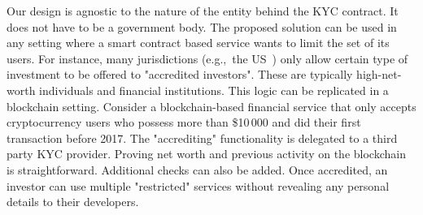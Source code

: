 Our design is agnostic to the nature of the entity behind the KYC contract.
It does not have to be a government body.
The proposed solution can be used in any setting where a smart contract based service wants to limit the set of its users.
For instance, many jurisdictions (e.g.,~the US~\cite{SEC}) only allow certain type of investment to be offered to "accredited investors".
These are typically high-net-worth individuals and financial institutions.
This logic can be replicated in a blockchain setting.
Consider a blockchain-based financial service that only accepts cryptocurrency users who possess more than \$10\,000 and did their first transaction before 2017.
The "accrediting" functionality is delegated to a third party KYC provider.
Proving net worth and previous activity on the blockchain is straightforward.
Additional checks can also be added.
Once accredited, an investor can use multiple "restricted" services without revealing any personal details to their developers.

